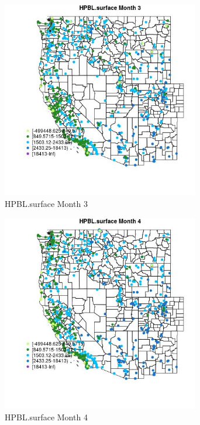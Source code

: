 \begin{figure} 
\centering  
\includegraphics[width=0.77\textwidth]{Code_Outputs/Report_ML_input_PM25_Step4_part_e_de_duplicated_aves_compiled_2019-05-21wNAs_MapObsMo3HPBLsurface.jpg} 
\caption{\label{fig:Report_ML_input_PM25_Step4_part_e_de_duplicated_aves_compiled_2019-05-21wNAsMapObsMo3HPBLsurface}HPBL.surface Month 3} 
\end{figure} 
 

\begin{figure} 
\centering  
\includegraphics[width=0.77\textwidth]{Code_Outputs/Report_ML_input_PM25_Step4_part_e_de_duplicated_aves_compiled_2019-05-21wNAs_MapObsMo4HPBLsurface.jpg} 
\caption{\label{fig:Report_ML_input_PM25_Step4_part_e_de_duplicated_aves_compiled_2019-05-21wNAsMapObsMo4HPBLsurface}HPBL.surface Month 4} 
\end{figure} 
 

